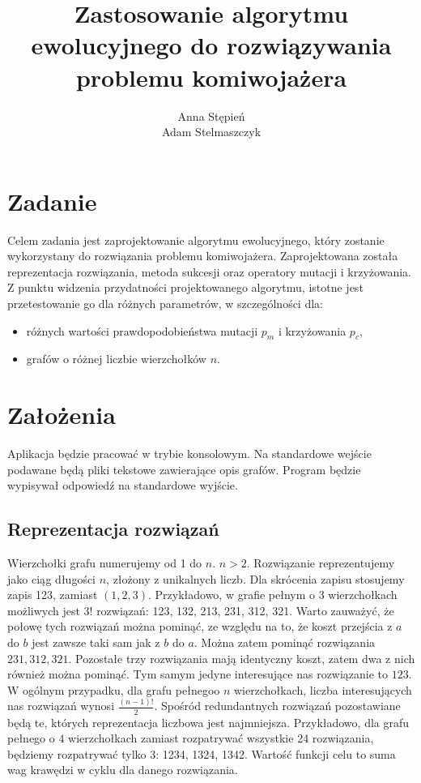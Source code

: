\documentclass[12pt, a4paper]{article}
\title{\textbf{Zastosowanie algorytmu ewolucyjnego do rozwiązywania problemu komiwojażera}}
\author{Anna Stępień \\ Adam Stelmaszczyk}
\date{}
\begin{document}
\maketitle

\section{Zadanie}
Celem zadania jest zaprojektowanie algorytmu ewolucyjnego, który zostanie wykorzystany do rozwiązania problemu komiwojażera.
Zaprojektowana została reprezentacja rozwiązania, metoda sukcesji oraz operatory mutacji i krzyżowania. 
Z punktu widzenia przydatności projektowanego algorytmu, istotne jest przetestowanie go dla różnych parametrów, w szczególności dla:
\begin{itemize}
	\item różnych wartości prawdopodobieństwa mutacji $p_m$ i krzyżowania $p_c$,
	\item grafów o różnej liczbie wierzchołków $n$.
\end{itemize}

\section{Założenia}
Aplikacja będzie pracować w trybie konsolowym. Na standardowe wejście podawane będą pliki tekstowe zawierające opis grafów.
Program będzie wypisywał odpowiedź na standardowe wyjście.

\subsection{Reprezentacja rozwiązań}

Wierzchołki grafu numerujemy od 1 do $n$. $n > 2$. Rozwiązanie reprezentujemy jako ciąg długości $n$, złożony z unikalnych liczb. 
Dla skrócenia zapisu stosujemy zapis 123, zamiast $(1,2,3)$. Przykładowo, w grafie pełnym o 3 wierzchołkach możliwych jest $3!$ rozwiązań: 123, 132, 213, 231, 312, 321.
Warto zauważyć, że połowę tych rozwiązań można pominąć, ze względu na to, że koszt przejścia z $a$ do $b$ jest zawsze 
taki sam jak z $b$ do $a$. Można zatem pominąć rozwiązania $231, 312, 321$. Pozostałe trzy rozwiązania mają identyczny koszt,
zatem dwa z nich również można pominąć. Tym samym jedyne interesujące nas rozwiązanie to $123$.
W ogólnym przypadku, dla grafu pełnegoo $n$ wierzchołkach, liczba interesujących nas rozwiązań wynosi $\frac{(n-1)!}{2}$. Spośród redundantnych rozwiązań pozostawiane będą te,
których reprezentacja liczbowa jest najmniejsza. Przykładowo, dla grafu pełnego o $4$ wierzchołkach zamiast rozpatrywać wszystkie
24 rozwiązania, będziemy rozpatrywać tylko 3: 1234, 1324, 1342. 
Wartość funkcji celu to suma wag krawędzi w cyklu dla danego rozwiązania.
\end{document}
